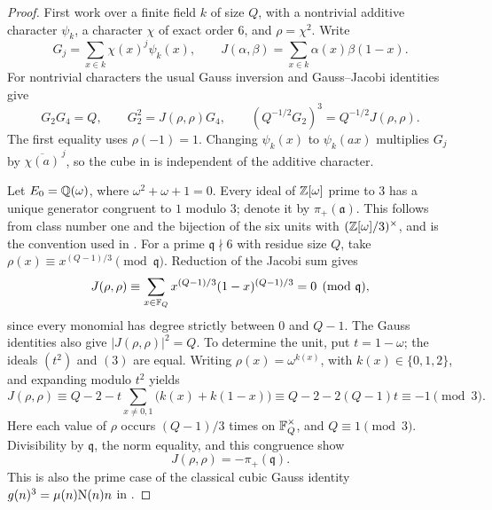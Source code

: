 \begin{proof}
First work over a finite field \(k\) of size \(Q\), with a nontrivial
additive character \(\psi_k\), a character \(\chi\) of exact order \(6\), and
\(\rho=\chi^2\).  Write
\[
 G_j=\sum_{x\in k}\chi(x)^j\psi_k(x),\qquad
 J(\alpha,\beta)=\sum_{x\in k}\alpha(x)\beta(1-x).
\]
For nontrivial characters the usual Gauss inversion and Gauss--Jacobi
identities give
\begin{equation}
 G_2G_4=Q,\qquad G_2^2=J(\rho,\rho)G_4,\qquad
 (Q^{-1/2}G_2)^3=Q^{-1/2}J(\rho,\rho).\label{eq:cubic-jacobi}
\end{equation}
The first equality uses \(\rho(-1)=1\).  Changing \(\psi_k(x)\) to
\(\psi_k(ax)\) multiplies \(G_j\) by \(\overline{\chi(a)}^{\,j}\), so the
cube in  is independent of the additive character.

Let \(E_0=\mathbb{Q}(\omega)\), where \(\omega^2+\omega+1=0\).  Every ideal of
\(\mathbb{Z}[\omega]\) prime to \(3\) has a unique generator congruent to \(1\)
modulo \(3\); denote it by \(\pi_+(\mathfrak a)\).  This follows from class
number one and the bijection of the six units with
\((\mathbb{Z}[\omega]/3)^\times\), and is the convention used in
\cite[\S2.1]{BaierYoung10}.  For a prime \(\mathfrak q\nmid6\) with residue
size \(Q\), take
\(\rho(x)\equiv x^{(Q-1)/3}\pmod{\mathfrak q}\).  Reduction of the Jacobi
sum gives
\[
 J(\rho,\rho)\equiv
 \sum_{x\in\mathbb{F}_Q}x^{(Q-1)/3}(1-x)^{(Q-1)/3}=0
 \pmod{\mathfrak q},
\]
since every monomial has degree strictly between \(0\) and \(Q-1\).
The Gauss identities also give \(|J(\rho,\rho)|^2=Q\).
To determine the unit, put \(t=1-\omega\); the ideals \((t^2)\) and \((3)\)
are equal.  Writing \(\rho(x)=\omega^{k(x)}\), with \(k(x)\in\{0,1,2\}\),
and expanding modulo \(t^2\) yields
\[
 J(\rho,\rho)\equiv Q-2
   -t\sum_{x\ne0,1}\bigl(k(x)+k(1-x)\bigr)
 \equiv Q-2-2(Q-1)t\equiv-1\pmod3.
\]
Here each value of \(\rho\) occurs \((Q-1)/3\) times on
\(\mathbb{F}_Q^\times\), and \(Q\equiv1\pmod3\).  Divisibility by
\(\mathfrak q\), the norm equality, and this congruence show
\begin{equation}
 J(\rho,\rho)=-\pi_+(\mathfrak q).
\label{eq:eisenstein-jacobi}
\end{equation}
This is also the prime case of the classical cubic Gauss identity
\(g(n)^3=\mu(n)\mathrm{N}(n)n\) in
\cite[\S2.2, equation~(11) in arXiv:0804.2233v4]{BaierYoung10}.


\end{proof}
